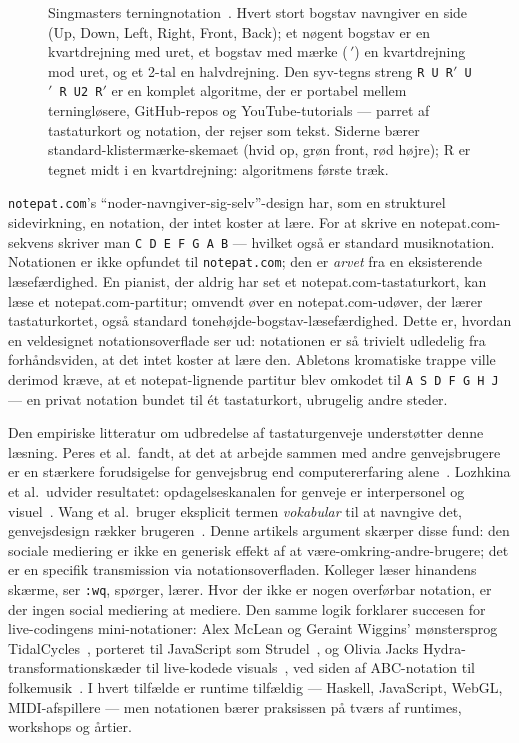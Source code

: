 \documentclass[10pt,letterpaper,twocolumn]{article}
\begin{document}
\begin{figure}[t]
{\begin{tikzpicture}
\end{tikzpicture}}
\caption{Singmasters terningnotation~\citep{singmaster1981notes}. Hvert stort bogstav navngiver en side (\textsf{U}p, \textsf{D}own, \textsf{L}eft, \textsf{R}ight, \textsf{F}ront, \textsf{B}ack); et nøgent bogstav er en kvartdrejning med uret, et bogstav med mærke ($\,'$) en kvartdrejning mod uret, og et 2-tal en halvdrejning. Den syv-tegns streng \texttt{R U R$'$ U$'$ R U2 R$'$} er en komplet algoritme, der er portabel mellem terningløsere, GitHub-repos og YouTube-tutorials --- parret af tastaturkort og notation, der rejser som tekst. Siderne bærer standard-klistermærke-skemaet (hvid op, grøn front, rød højre); \textsf{R} er tegnet midt i en kvartdrejning: algoritmens første træk.}
\label{fig:singmaster}
\end{figure}

\texttt{notepat.com}'s ``noder-navngiver-sig-selv''-design har, som en strukturel sidevirkning, en notation, der intet koster at lære. For at skrive en notepat.com-sekvens skriver man \texttt{C D E F G A B} --- hvilket også er standard musiknotation. Notationen er ikke opfundet til \texttt{notepat.com}; den er \emph{arvet} fra en eksisterende læsefærdighed. En pianist, der aldrig har set et notepat.com-tastaturkort, kan læse et notepat.com-partitur; omvendt øver en notepat.com-udøver, der lærer tastaturkortet, også standard tonehøjde-bogstav-læsefærdighed. Dette er, hvordan en veldesignet notationsoverflade ser ud: notationen er så trivielt udledelig fra forhåndsviden, at det intet koster at lære den. Abletons kromatiske trappe ville derimod kræve, at et notepat-lignende partitur blev omkodet til \texttt{A S D F G H J} --- en privat notation bundet til ét tastaturkort, ubrugelig andre steder.

Den empiriske litteratur om udbredelse af tastaturgenveje understøtter denne læsning. Peres et al.\ fandt, at det at arbejde sammen med andre genvejsbrugere er en stærkere forudsigelse for genvejsbrug end computererfaring alene~\citep{peres2004shortcut}. Lozhkina et al.\ udvider resultatet: opdagelseskanalen for genveje er interpersonel og visuel~\citep{lozhkina2025discovery}. Wang et al.\ bruger eksplicit termen \emph{vokabular} til at navngive det, genvejsdesign rækker brugeren~\citep{wang2020keymap}. Denne artikels argument skærper disse fund: den sociale mediering er ikke en generisk effekt af at være-omkring-andre-brugere; det er en specifik transmission via notationsoverfladen. Kolleger læser hinandens skærme, ser \texttt{:wq}, spørger, lærer. Hvor der ikke er nogen overførbar notation, er der ingen social mediering at mediere. Den samme logik forklarer succesen for live-codingens mini-notationer: Alex McLean og Geraint Wiggins' mønstersprog TidalCycles~\citep{mclean2010tidal}, porteret til JavaScript som Strudel~\citep{roos2023strudel}, og Olivia Jacks Hydra-transformationskæder til live-kodede visuals~\citep{jack2018hydra}, ved siden af ABC-notation til folkemusik~\citep{walshaw_abc}. I hvert tilfælde er runtime tilfældig --- Haskell, JavaScript, WebGL, MIDI-afspillere --- men notationen bærer praksissen på tværs af runtimes, workshops og årtier.
\end{document}
